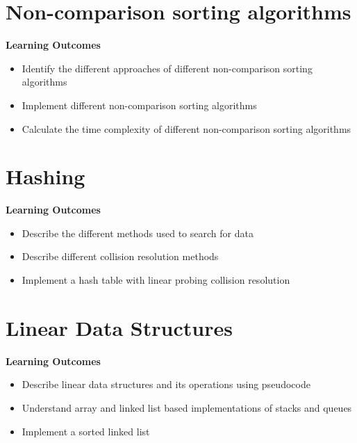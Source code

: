 
\section{Non-comparison sorting algorithms}
\begin{mdframed}
    \textbf{Learning Outcomes}
    \begin{itemize}[label={\checkmark}]
        \item Identify the different approaches of different non-comparison sorting algorithms
        \item Implement different non-comparison sorting algorithms
        \item Calculate the time complexity of different non-comparison sorting algorithms
    \end{itemize}
\end{mdframed}

\subsection{}




\section{Hashing}
\begin{mdframed}
    \textbf{Learning Outcomes}
    \begin{itemize}[label={\checkmark}]
        \item Describe the different methods used to search for data
        \item Describe different collision resolution methods
        \item Implement a hash table with linear probing collision resolution
    \end{itemize}
\end{mdframed}

\subsection{}




\section{Linear Data Structures}
\begin{mdframed}
    \textbf{Learning Outcomes}
    \begin{itemize}[label={\checkmark}]
        \item Describe linear data structures and its operations using pseudocode
        \item Understand array and linked list based implementations of stacks and queues
        \item Implement a sorted linked list
    \end{itemize}
\end{mdframed}

